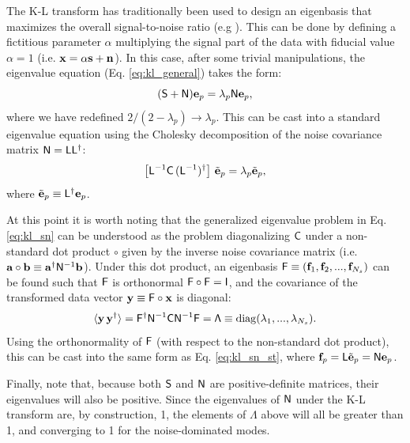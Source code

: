 \documentclass[twocolumn,amsfont,amssymb,amsmath, showpacs,balancelastpage, nofootinbib]{revtex4-1}
\begin{document}
      The K-L transform has traditionally been used to design an eigenbasis that maximizes the overall signal-to-noise ratio (e.g \cite{1995PhRvL..74.4369B,1996ApJ...465...34V}). This can be done by defining a fictitious parameter $\alpha$ multiplying the signal part of the data with fiducial value $\alpha=1$ (i.e. ${\bf x}=\alpha{\bf s}+{\bf n}$). In this case, after some trivial manipulations, the eigenvalue equation (Eq. \ref{eq:kl_general}) takes the form:
      \begin{equation}\label{eq:kl_sn}
        ({\sf S}+{\sf N}){\bf e}_p=\lambda_p{\sf N}{\bf e}_p,
      \end{equation}
      where we have redefined $2/(2-\lambda_p)\rightarrow\lambda_p$. This can be cast into a standard eigenvalue equation using the Cholesky decomposition of the noise covariance matrix ${\sf N}={\sf L}{\sf L}^\dag$:
      \begin{equation}\label{eq:kl_sn_st}
        \left[{\sf L}^{-1}{\sf C}\,({\sf L}^{-1})^\dag\right]\,\tilde{\bf e}_p=\lambda_p\tilde{\bf e}_p,
      \end{equation}
      where $\tilde{\bf e}_p\equiv{\sf L}^\dag{\bf e}_p$.
      
      At this point it is worth noting that the generalized eigenvalue problem in Eq. \ref{eq:kl_sn} can be understood as the problem diagonalizing ${\sf C}$ under a non-standard dot product $\circ$ given by the inverse noise covariance matrix (i.e. ${\bf a}\circ{\bf b}\equiv{\bf a}^\dag{\sf N}^{-1}{\bf b}$). Under this dot product, an eigenbasis ${\sf F}\equiv({\bf f}_1,{\bf f}_2,...,{\bf f}_{N_s})$ can be found such that ${\sf F}$ is orthonormal ${\sf F}\circ{\sf F}={\sf I}$, and the covariance of the transformed data vector ${\bf y}\equiv{\sf F}\circ{\bf x}$ is diagonal:
      \begin{equation}\label{eq:kl_sn_prod}
        \langle{\bf y}\,{\bf y}^\dag\rangle={\sf F}^\dag{\sf N}^{-1}{\sf C}{\sf N}^{-1}{\sf F}={\sf \Lambda}\equiv{\rm diag}(\lambda_1,...,\lambda_{N_s}).
      \end{equation}
      Using the orthonormality of ${\sf F}$ (with respect to the non-standard dot product), this can be cast into the same form as Eq. \ref{eq:kl_sn_st}, where ${\bf f}_p={\sf L}\tilde{\bf e}_p={\sf N}{\bf e}_p$.
      
      Finally, note that, because both ${\sf S}$ and ${\sf N}$ are positive-definite matrices, their eigenvalues will also be positive. Since the eigenvalues of ${\sf N}$ under the K-L transform are, by construction, 1, the elements of $\Lambda$ above will all be greater than 1, and converging to 1 for the noise-dominated modes.
      
\end{document}
